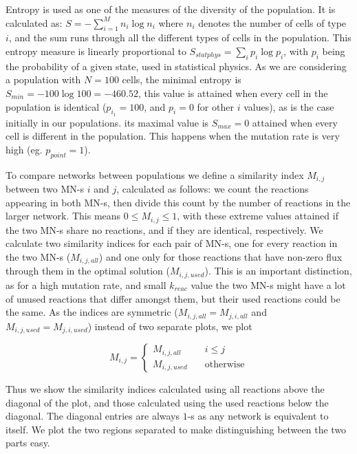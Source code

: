 \documentclass[a4paper,12pt]{article}
\begin{document}
Entropy is used as one of the measures of the diversity of the population. It is calculated as: $S=- \sum^{M}_{i=1} n_i \log n_i $ where $n_i$ denotes the number of cells of type $i$, and the sum runs through all the different types of cells in the population. This entropy measure is linearly proportional to $S_{statphys}=\sum_i p_i \log p_i$, with $p_i$ being the probability of a given state, used in statistical physics. As we are considering a population with $N=100$ cells, the minimal entropy is $S_{min}=-100\log100=-460.52$, this value is attained when every cell in the population is identical ($p_{i_1}=100$, and $p_i=0$ for other $i$ values), as is the case initially in our populations. its maximal value is $S_{max}=0$ attained when every cell is different in the population. This happens when the mutation rate is very high (eg. $p_{point}=1$). 


To compare networks between populations we define a similarity index $M_{i,j}$ between two MN-s $i$ and $j$, calculated as follows: we count the reactions appearing in both MN-s, then divide this count by the number of reactions in the larger network. This means $0\leq M_{i,j} \leq 1$, with these extreme values attained if the two MN-s share no reactions, and if they are identical, respectively. We calculate two similarity indices for each pair of MN-s, one for every reaction in the two MN-s ($M_{i,j,all}$) and one only for those reactions that have non-zero flux through them in the optimal solution ($M_{i,j,used}$). This is an important distinction, as for a high mutation rate, and small $k_{reac}$ value the two MN-s might have a lot of unused reactions that differ amongst them, but their used reactions could be the same.  As the indices are symmetric ($M_{i,j,all}=M_{j,i,all}$ and  $M_{i,j,used}=M_{j,i,used}$) instead of two separate plots, we plot 

$$
M_{i,j}= \left\{
	\begin{array}{ll}
		M_{i,j,all} & \quad i \leq j \\
		M_{i,j,used} & \quad \text{otherwise}
	\end{array}
\right.
$$

Thus we show the similarity indices calculated using all reactions above the diagonal of the plot, and those calculated using the used reactions below the diagonal. The diagonal entries are always $1$-s as any network is equivalent to itself. We plot the two regions separated to make distinguishing between the two parts easy.
\end{document}
